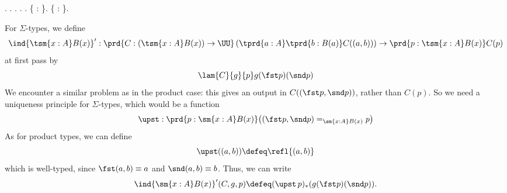 \begin{coqdoccode}
\coqdocindent{1.00em}
.\coqdoceol
\coqdocindent{2.00em}
.\coqdoceol
\coqdocindent{1.00em}
.\coqdoceol
\coqdocemptyline
\coqdocnoindent
{} .\coqdoceol
\coqdocemptyline
\coqdocnoindent
{} .\coqdoceol
\coqdocindent{1.00em}
 \{ : \}.\coqdoceol
\coqdocindent{1.00em}
 \{ :   \}.\coqdoceol
\coqdocemptyline
\end{coqdoccode}
For $\Sigma$-types, we define
\[
  \ind{\tsm{x:A}B(x)}' : \prd{C:(\tsm{x:A}B(x)) \to \UU}
  \left(\tprd{a:A}\tprd{b:B(a)}C((a, b))\right) \to \prd{p: \tsm{x:A}B(x)}C(p)
\]
at first pass by
\[
  \lam{C}{g}{p}g(\fst p)(\snd p)
\]
We encounter a similar problem as in the product case: this gives an output in
$C((\fst p, \snd p))$, rather than $C(p)$.  So we need a uniqueness
principle for $\Sigma$-types, which would be a function
\[
  \upst : \prd{p : \sm{x:A}B(x)} \big( (\fst p, \snd p) =_{\sm{x:A}B(x)} p \big)
\]
As for product types, we can define
\[
  \upst((a, b)) \defeq \refl{(a, b)}
\]
which is well-typed, since $\fst(a, b) \equiv a$ and $\snd(a, b) \equiv b$.
Thus, we can write
\[
  \ind{\sm{x:A}B(x)}'(C, g, p) \defeq (\upst\, p)_{*}(g(\fst p)(\snd p)).
\]

